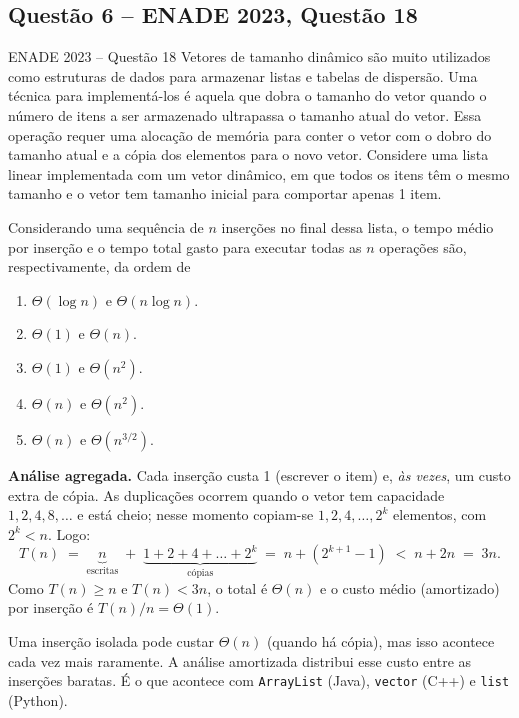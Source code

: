 \documentclass[11pt,a4paper]{article}
\newcommand{\solucao}{\par\medskip\noindent{\large\bfseries\color{verde}Solução}\par\smallskip}
\begin{document}
\subsection{Questão 6 -- ENADE 2023, Questão 18}
\begin{enunciado}{ENADE 2023 -- Questão 18}
Vetores de tamanho dinâmico são muito utilizados como estruturas de dados para armazenar listas e
tabelas de dispersão. Uma técnica para implementá-los é aquela que dobra o tamanho do vetor quando
o número de itens a ser armazenado ultrapassa o tamanho atual do vetor. Essa operação requer uma
alocação de memória para conter o vetor com o dobro do tamanho atual e a cópia dos elementos para o
novo vetor. Considere uma lista linear implementada com um vetor dinâmico, em que todos os itens têm
o mesmo tamanho e o vetor tem tamanho inicial para comportar apenas 1 item.

Considerando uma sequência de $n$ inserções no final dessa lista, o tempo médio por inserção e o tempo
total gasto para executar todas as $n$ operações são, respectivamente, da ordem de
\begin{enumerate}[label=\Alph*)]
  \item $\Theta(\log n)$ e $\Theta(n\log n)$.
  \item $\Theta(1)$ e $\Theta(n)$.
  \item $\Theta(1)$ e $\Theta(n^2)$.
  \item $\Theta(n)$ e $\Theta(n^2)$.
  \item $\Theta(n)$ e $\Theta(n^{3/2})$.
\end{enumerate}
\end{enunciado}

\solucao
\textbf{Análise agregada.} Cada inserção custa 1 (escrever o item) e, \emph{às vezes}, um custo extra de
cópia. As duplicações ocorrem quando o vetor tem capacidade $1, 2, 4, 8, \dots$ e está cheio; nesse
momento copiam-se $1, 2, 4, \dots, 2^k$ elementos, com $2^k < n$. Logo:
\[
  T(n) \;=\; \underbrace{n}_{\text{escritas}} \;+\; \underbrace{1 + 2 + 4 + \dots + 2^{k}}_{\text{cópias}}
  \;=\; n + (2^{k+1} - 1) \;<\; n + 2n \;=\; 3n .
\]
Como $T(n) \ge n$ e $T(n) < 3n$, o total é $\Theta(n)$ e o custo médio (amortizado) por inserção é
$T(n)/n = \Theta(1)$.

Uma inserção isolada pode custar $\Theta(n)$ (quando há cópia), mas isso acontece cada vez mais raramente.
A análise amortizada distribui esse custo entre as inserções baratas. É o que acontece com
\texttt{ArrayList} (Java), \texttt{vector} (C++) e \texttt{list} (Python).
\end{document}
